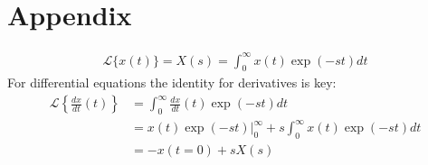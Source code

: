 \chapter{Appendix}
\begin{align*}
\mathcal{L}\{x(t)\}=X(s)=\int_0^\infty x(t)\exp (-st)dt
\end{align*}
For differential equations the identity for derivatives is key:
\begin{align*}
\mathcal{L} \left\{ \frac{dx}{dt}(t) \right\} &=\int_0^\infty \frac{dx}{dt}(t)\exp (-st)dt\\
&=x(t)\exp(-st)\rvert _0^\infty + s  \int_0^\infty x(t)\exp (-st)dt\\
&=-x(t=0) + sX(s)
\end{align*}

